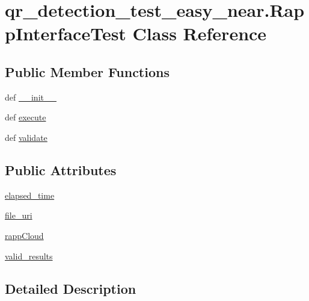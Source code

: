 \hypertarget{classqr__detection__test__easy__near_1_1RappInterfaceTest}{\section{qr\-\_\-detection\-\_\-test\-\_\-easy\-\_\-near.\-Rapp\-Interface\-Test Class Reference}
\label{classqr__detection__test__easy__near_1_1RappInterfaceTest}
}
\subsection*{Public Member Functions}
\begin{DoxyCompactItemize}
\item 
def \hyperlink{classqr__detection__test__easy__near_1_1RappInterfaceTest_a0a5d4cde1e1d029816c94ce30672654b}{\-\_\-\-\_\-init\-\_\-\-\_\-}
\item 
def \hyperlink{classqr__detection__test__easy__near_1_1RappInterfaceTest_a851cc54edf0775aecefa9f4d2d37e975}{execute}
\item 
def \hyperlink{classqr__detection__test__easy__near_1_1RappInterfaceTest_a2e532b7365424c2104cd877eb8b96c64}{validate}
\end{DoxyCompactItemize}
\subsection*{Public Attributes}
\begin{DoxyCompactItemize}
\item 
\hyperlink{classqr__detection__test__easy__near_1_1RappInterfaceTest_a5b81f7c47720123200c133e0da1eabb3}{elapsed\-\_\-time}
\item 
\hyperlink{classqr__detection__test__easy__near_1_1RappInterfaceTest_a7fe236876df6945e3d9a1759df16e972}{file\-\_\-uri}
\item 
\hyperlink{classqr__detection__test__easy__near_1_1RappInterfaceTest_af9d28ceb1b2c1c3bd81746ab7809ba22}{rapp\-Cloud}
\item 
\hyperlink{classqr__detection__test__easy__near_1_1RappInterfaceTest_aa80460bb9728f7b3bd759e102f52e95a}{valid\-\_\-results}
\end{DoxyCompactItemize}


\subsection{Detailed Description}


